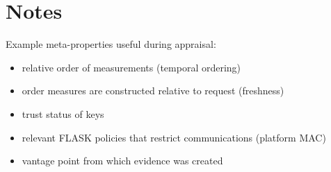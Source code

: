 \documentclass[10pt]{article}
\newcommand{\squash}{\parskip=0pt\itemsep=0pt}
\begin{document}
\nocite{Coker::Principles-of-R,Loscocco:98:The-Inevitabili}

\section*{Notes}

Example meta-properties useful during appraisal:

\begin{itemize}
  \squash
\item relative order of measurements (temporal ordering)
\item order measures are constructed relative to request (freshness)
\item trust status of keys
\item relevant FLASK policies that restrict communications (platform MAC)
\item vantage point from which evidence was created
\end{itemize}


\end{document}
